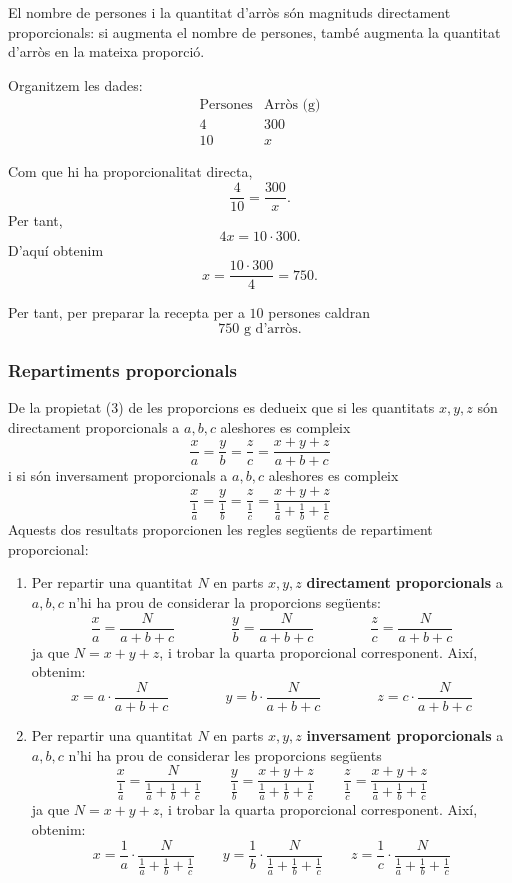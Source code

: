 \begin{solucio}
El nombre de persones i la quantitat d'arròs són magnituds directament proporcionals: si augmenta el nombre de persones, també augmenta la quantitat d'arròs en la mateixa proporció.

Organitzem les dades:
\[
\begin{array}{c|c}
\text{Persones} & \text{Arròs (g)}\\
\hline
4 & 300\\
10 & x
\end{array}
\]

Com que hi ha proporcionalitat directa,
\[
	\frac{4}{10}=\frac{300}{x}.
\]
Per tant,
\[
	4x=10\cdot 300.
\]
D'aquí obtenim
\[
	x=\frac{10\cdot 300}{4}=750.
\]

Per tant, per preparar la recepta per a \(10\) persones caldran
\[
	750\text{ g d'arròs}.
\]
\end{solucio}

\subsubsection{Repartiments proporcionals}

De la propietat (3) de les proporcions es dedueix que si les quantitats
\(x,y,z\) són directament proporcionals a \(a,b,c\) aleshores es compleix%
\[
\frac{x}{a}=\frac{y}{b}=\frac{z}{c}=\frac{x+y+z}{a+b+c}%
\]
i si són inversament proporcionals a \(a,b,c\) aleshores es compleix%
\[
\frac{x}{\frac{1}{a}}=\frac{y}{\frac{1}{b}}=\frac{z}{\frac{1}{c}}=\frac
{x+y+z}{\frac{1}{a}+\frac{1}{b}+\frac{1}{c}}%
\]
Aquests dos resultats proporcionen les regles següents de repartiment proporcional:

\begin{enumerate}
\item[(1)] Per repartir una quantitat \(N\) en parts \(x,y,z\)
\textbf{directament proporcionals} a \(a,b,c\) n’hi ha prou de considerar la proporcions següents:%
\[
\frac{x}{a}=\frac{N}{a+b+c}\qquad\qquad\frac{y}{b}=\frac{N}{a+b+c}\qquad
\qquad\frac{z}{c}=\frac{N}{a+b+c}%
\]
ja que \(N=x+y+z\), i trobar la quarta proporcional corresponent.
Així, obtenim:%
\[
x=a\cdot\frac{N}{a+b+c}\qquad\qquad y=b\cdot\frac{N}{a+b+c}\qquad\qquad
z=c\cdot\frac{N}{a+b+c}%
\]


\item[(2)] Per repartir una quantitat \(N\) en parts \(x,y,z\)
\textbf{inversament proporcionals} a \(a,b,c\) n’hi ha prou de considerar les proporcions següents%
\[
\frac{x}{\frac{1}{a}}=\frac{N}{\frac{1}{a}+\frac{1}{b}+\frac{1}{c}}\qquad
\frac{y}{\frac{1}{b}}=\frac{x+y+z}{\frac{1}{a}+\frac{1}{b}+\frac{1}{c}}%
\qquad\frac{z}{\frac{1}{c}}=\frac{x+y+z}{\frac{1}{a}+\frac{1}{b}+\frac{1}{c}}%
\]
ja que \(N=x+y+z\), i trobar la quarta proporcional corresponent.
Així, obtenim:%
\[
x=\frac{1}{a}\cdot\frac{N}{\frac{1}{a}+\frac{1}{b}+\frac{1}{c}}\qquad
y=\frac{1}{b}\cdot\frac{N}{\frac{1}{a}+\frac{1}{b}+\frac{1}{c}}\qquad
z=\frac{1}{c}\cdot\frac{N}{\frac{1}{a}+\frac{1}{b}+\frac{1}{c}}%
\]

\end{enumerate}

